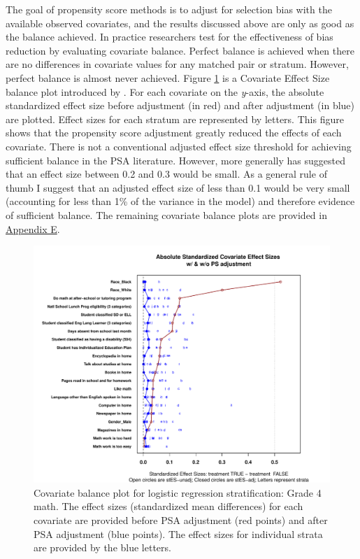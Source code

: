 \documentclass[letterpaper,12p,twoside]{article} %
\begin{document}
The goal of propensity score methods is to adjust for selection bias with the available observed covariates, and the results discussed above are only as good as the balance achieved. In practice researchers test for the effectiveness of bias reduction by evaluating covariate balance. Perfect balance is achieved when there are no differences in covariate values for any matched pair or stratum. However, perfect balance is almost never achieved. Figure \ref{fig:g4math:balance} is a Covariate Effect Size balance plot introduced by . For each covariate on the \textit{y}-axis, the absolute standardized effect size before adjustment (in red) and after adjustment (in blue) are plotted. Effect sizes for each stratum are represented by letters. This figure shows that the propensity score adjustment greatly reduced the effects of each covariate. There is not a conventional adjusted effect size threshold for achieving sufficient balance in the PSA literature. However, more generally  has suggested that an effect size between 0.2 and 0.3 would be small. As a general rule of thumb I suggest that an adjusted effect size of less than 0.1 would be very small (accounting for less than 1\% of the variance in the model) and therefore evidence of sufficient balance. The remaining covariate balance plots are provided in \hyperref[appendixE]{Appendix E}.



\setlength{\belowcaptionskip}{-10pt}
\begin{figure}[t]
\begin{center}
\includegraphics[width=\textwidth]{../Figures2009/g4math-lr-balance.pdf}
\caption[Covariate balance plot for logistic regression stratification: Grade 4 math]{Covariate balance plot \cite{HelmreichPruzek2009} for logistic regression stratification: Grade 4 math. The effect sizes (standardized mean differences) for each covariate are provided before PSA adjustment (red points) and after PSA adjustment (blue points). The effect sizes for individual strata are provided by the blue letters.}
\label{fig:g4math:balance}
\end{center}
\end{figure}
\setlength{\belowcaptionskip}{0pt}
\end{document}
